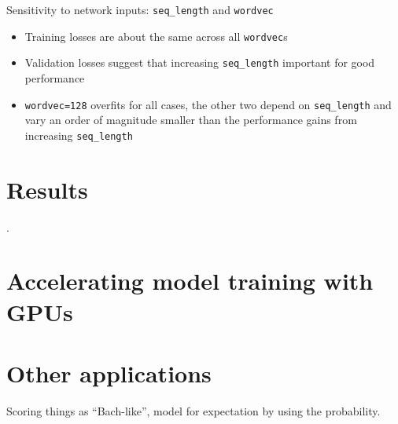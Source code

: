 Sensitivity to network inputs: \texttt{seq\_length} and \texttt{wordvec}
\begin{itemize}
    \item Training losses are about the same across all \texttt{wordvec}s
    \item Validation losses suggest that increasing \texttt{seq\_length} important for
        good performance 
    \item \texttt{wordvec=128} overfits for all cases, the other two depend on
        \texttt{seq\_length} and vary an order of magnitude smaller than the
        performance gains from increasing \texttt{seq\_length}
\end{itemize}

\section{Results}

.


\section{Accelerating model training with GPUs}



\section{Other applications}

Scoring things as ``Bach-like'', model for expectation by using the probability.
